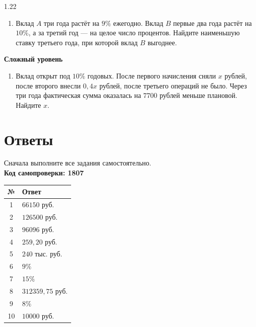 \documentclass[a4paper,12pt]{article}
\begin{document}
\begin{spacing}{1.22}
\begin{enumerate}[resume]
  \item Вклад $A$ три года растёт на $9\%$ ежегодно. Вклад $B$ первые два
  года растёт на $10\%$, а за третий год --- на целое число процентов.
  Найдите наименьшую ставку третьего года, при которой вклад $B$ выгоднее.
\end{enumerate}

\textbf{Сложный уровень}

\begin{enumerate}[resume]
  \item Вклад открыт под $10\%$ годовых. После первого начисления сняли
  $x$ рублей, после второго внесли $0{,}4x$ рублей, после третьего операций
  не было. Через три года фактическая сумма оказалась на $7700$ рублей меньше
  плановой. Найдите $x$.
\end{enumerate}
\end{spacing}

\clearpage
\section*{Ответы}

\begin{center}
\textcolor{softgray}{Сначала выполните все задания самостоятельно.}\\[4pt]
\textbf{Код самопроверки: 1807}
\end{center}

\begin{longtable}{@{}cl@{}}
\toprule
\textbf{№} & \textbf{Ответ} \\
\midrule
\endhead
1 & $66150$ руб. \\
2 & $126500$ руб. \\
3 & $96096$ руб. \\
4 & $259{,}20$ руб. \\
5 & $240$ тыс. руб. \\
6 & $9\%$ \\
7 & $15\%$ \\
8 & $312359{,}75$ руб. \\
9 & $8\%$ \\
10 & $10000$ руб. \\
\bottomrule
\end{longtable}
\end{document}
